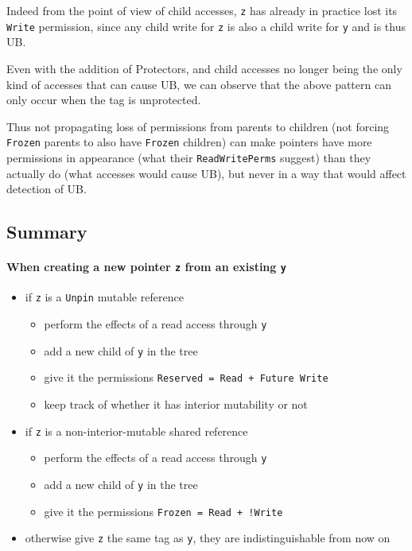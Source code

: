 \documentclass[a4paper,11pt]{article}
\theoremstyle{plain}
\theoremstyle{definition}
\theoremstyle{remark}
\newcommand{\tcode}[1]{\texttt{#1}}
\newcommand{\tperm}[1]{\texttt{#1}}
\begin{document}
Indeed from the point of view of child accesses, \tcode{z} has already in practice lost
its \tperm{Write} permission, since any child write for \tcode{z} is also a child write for
\tcode{y} and is thus UB.

Even with the addition of Protectors, and child accesses no longer being the only
kind of accesses that can cause UB, we can observe that the above pattern can
only occur when the tag is unprotected.

Thus not propagating loss of permissions from parents to children (not forcing \tperm{Frozen}
parents to also have \tperm{Frozen} children) can make pointers have more permissions in
appearance (what their \tcode{ReadWritePerms} suggest) than they actually do (what
accesses would cause UB), but never in a way that would affect detection of UB.

\subsection{Summary}

\paragraph*{When creating a new pointer \tcode{z} from an existing \tcode{y}}
\begin{itemize}
    \item if \tcode{z} is a \tcode{Unpin} mutable reference
        \begin{itemize}
            \item perform the effects of a read access through \tcode{y}
            \item add a new child of \tcode{y} in the tree
            \item give it the permissions \tperm{Reserved = Read + Future Write}
            \item keep track of whether it has interior mutability or not
        \end{itemize}
    \item if \tcode{z} is a non-interior-mutable shared reference
        \begin{itemize}
            \item perform the effects of a read access through \tcode{y}
            \item add a new child of \tcode{y} in the tree
            \item give it the permissions \tperm{Frozen = Read + !Write}
        \end{itemize}
    \item otherwise give \tcode{z} the same tag as \tcode{y}, they are indistinguishable from now on
\end{itemize}
\end{document}
